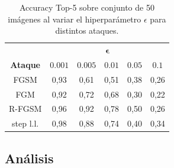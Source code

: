 \documentclass[conference]{IEEEtran}
\begin{document}
\begin{table}[!t]
    \centering
    \caption{Accuracy Top-5 sobre conjunto de 50 imágenes al variar el hiperparámetro $\epsilon$ para distintos ataques.}
    \label{adv_top5_table}
    \begin{tabular}{cccccc} 
    \toprule 
     & \multicolumn{5}{c}{$\bm{\epsilon}$} \\ \cmidrule{2-6}
    \textbf{Ataque} & $0.001$ & $0.005$ & $0.01$ & $0.05$ & $0.1$ \\ \midrule
    FGSM & 0,93 & 0,61 & 0,51 & 0,38 & 0,26 \\ 
    FGM & 0,92 & 0,72 & 0,68 & 0,30 & 0,22 \\ 
    R-FGSM & 0,96 & 0,92 & 0,78 & 0,50 & 0,26 \\
    step l.l. & 0,98 & 0,88 & 0,74 & 0,40 & 0,34 \\ \bottomrule
    \end{tabular}
\end{table}

\subsection{Análisis}
\end{document}

